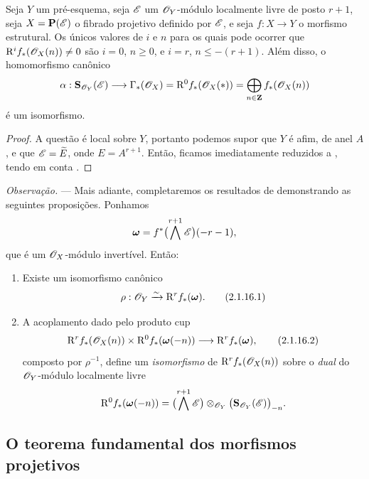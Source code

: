 \begin{proposition}[2.1.15]
\label{III.2.1.15}
Seja $Y$ um pré-esquema, seja $\mathscr{E}$ um $\mathscr{O}_Y$-módulo localmente livre de posto $r+1$, seja $X=\mathbf{P}(\mathscr{E})$ o fibrado projetivo definido por $\mathscr{E}$, e seja $f:X\to Y$ o morfismo estrutural.
Os únicos valores de $i$ e $n$ para os quais pode ocorrer que $\mathrm{R}^if_*(\mathscr{O}_X(n))\neq0$ são $i=0$, $n\geq0$, e $i=r$, $n\leq-(r+1)$.
Além disso, o homomorfismo canônico 
\[
  \alpha:\mathbf{S}_{\mathscr{O}_Y}(\mathscr{E})
  \longrightarrow \Gamma_*(\mathscr{O}_X)
  =\mathrm{R}^0f_*(\mathscr{O}_X(*))
  =\bigoplus_{n\in\mathbf{Z}}f_*(\mathscr{O}_X(n))
\]
é um isomorfismo.
\end{proposition}

\begin{proof}
A questão é local sobre $Y$, portanto podemos supor que $Y$ é afim, de anel $A$, e que $\mathscr{E}=\widetilde{E}$, onde $E=A^{r+1}$.
Então, ficamos imediatamente reduzidos a , tendo em conta .
\end{proof}

\begin{env}[2.1.16]
\label{III.2.1.16}
\emph{Observação.} ---
Mais adiante, completaremos os resultados de  demonstrando as seguintes proposições.
Ponhamos
\[
  \boldsymbol{\omega}=f^*\bigl(\bigwedge^{r+1}\mathscr{E}\bigr)(-r-1),
\]
que é um $\mathscr{O}_X$-módulo invertível.
Então:
\begin{enumerate}
  \item[{\rm(i) }] Existe um isomorfismo canônico
  \[
  \label{III.2.1.16.1}
    \rho:\sh{O}_Y \simto \RR^rf_*(\boldsymbol{\omega}).
    \tag{2.1.16.1}
  \]
  \item[{\rm(ii) }] A acoplamento dado pelo produto cup 
  \[
  \label{III.2.1.16.2}
    \RR^rf_*(\sh{O}_X(n))
    \times \RR^0f_*(\boldsymbol{\omega}(-n))
    \longrightarrow \RR^rf_*(\boldsymbol{\omega}),
    \tag{2.1.16.2}
  \]
  composto por $\rho^{-1}$, define um \emph{isomorfismo} de $\mathrm{R}^rf_*(\mathscr{O}_X(n))$ sobre o \emph{dual} do $\mathscr{O}_Y$-módulo localmente livre
  \[
    \mathrm{R}^0f_*(\boldsymbol{\omega}(-n))
    =\bigl(\bigwedge^{r+1}\mathscr{E}\bigr)
      \otimes_{\mathscr{O}_Y}
      \bigl(\mathbf{S}_{\mathscr{O}_Y}(\mathscr{E})\bigr)_{-n}.
  \]
\end{enumerate}
\end{env}

\subsection{O teorema fundamental dos morfismos projetivos}
\label{subsection:III.2.2}

